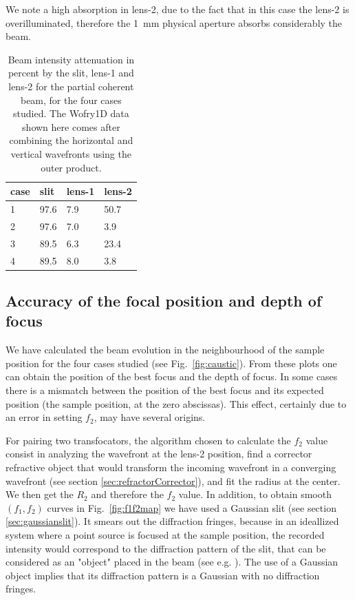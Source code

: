\documentclass{iucr}              %
\begin{document}
We note a high absorption in lens-2, due to the fact that in this case the lens-2 is overilluminated, therefore the \SI{1}{\milli\meter} physical aperture absorbs considerably the beam.



\begin{table}[]
    \label{table:absorption}
    \caption{Beam intensity attenuation in percent by the slit, lens-1 and lens-2 for the partial coherent beam, 
    for the four cases studied.
    The Wofry1D data shown here comes after combining the horizontal and vertical wavefronts using the outer product. 
    }
    \centering
\begin{tabular}{l|l|l|l}
case & slit & lens-1 & lens-2 \\
\hline
1       &   97.6   & 7.9  & 50.7  \\
2       &   97.6   & 7.0  & 3.9   \\
3       &   89.5   & 6.3  & 23.4  \\
4       &   89.5   & 8.0  & 3.8   \\
\end{tabular}
\end{table}
    

\subsection{Accuracy of the focal position and depth of focus}
\label{sec:caustic}

We have calculated the beam evolution in the neighbourhood of the sample position for the four cases studied (see Fig.~\ref{fig:caustic}). From these plots one can obtain the position of the best focus and the depth of focus. In some cases there is a mismatch between the position of the best focus and its expected position (the sample position, at the zero abscissas). This effect, certainly due to an error in setting $f_2$, may have several origins. 

For pairing two transfocators, the algorithm chosen to calculate the $f_2$ value consist in analyzing the wavefront at the lens-2 position, find a corrector refractive object that would transform the incoming wavefront in a converging wavefront (see section \ref{sec:refractorCorrector}), and fit the radius at the center. We then get the $R_2$ and therefore the $f_2$ value. In addition, to obtain smooth $(f_1,f_2)$ curves in Fig.~\ref{fig:f1f2map} we have used a Gaussian slit (see section \ref{sec:gaussianslit}). It smears out the diffraction fringes, because in an ideallized system where a point source is focused at the sample position, the recorded intensity would correspond to the diffraction pattern of the slit, that can be considered as an "object" placed in the beam (see e.g. \cite{paganin_book}). The use of a Gaussian object implies that its diffraction pattern is a Gaussian with no diffraction fringes. 
\end{document}
